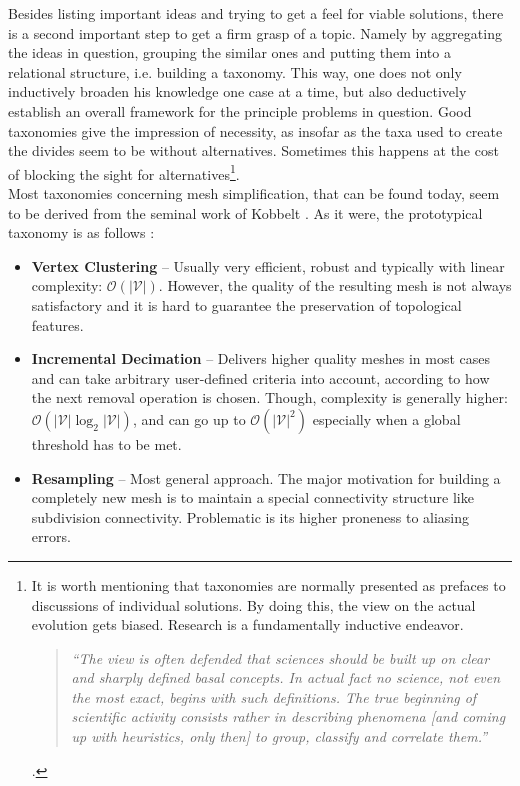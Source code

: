 Besides listing important ideas and trying to get a feel for viable solutions, there is a second important step to get a firm grasp of a topic.
Namely by aggregating the ideas in question, grouping the similar ones and putting them into a relational structure, i.e. building a taxonomy.
This way, one does not only inductively broaden his knowledge one case at a time, but also deductively establish an overall framework for the principle problems in question.
Good taxonomies give the impression of necessity, as insofar as the taxa used to create the divides seem to be without alternatives.
Sometimes this happens at the cost of blocking the sight for alternatives\footnote{ It is worth mentioning that taxonomies are normally presented as prefaces to discussions of individual solutions. By doing this, the view on the actual evolution gets biased. Research is a fundamentally inductive endeavor. \begin{quote} \textit{``The view is often defended that sciences should be built up on clear and sharply defined basal concepts. In actual fact no science, not even the most exact, begins with such definitions. The true beginning of scientific activity consists rather in describing phenomena [and coming up with heuristics, only then] to group, classify and correlate them.''} \citep[cf.][]{Freud1963} \end{quote}.}.\\
Most taxonomies concerning mesh simplification, that can be found today, seem to be derived from the seminal work of Kobbelt \citep[][cf. p.6]{Gotsman2002}.
As it were, the prototypical taxonomy is as follows \citep[][cf. p.11]{Shene2005}:
\begin{itemize}
  \setlength{\itemsep}{0cm}%
  \setlength{\parskip}{0cm}%
    \item \textbf{Vertex Clustering} -- Usually very efficient, robust and typically with linear complexity: $\mathcal{O}(|\mathcal{V}|)$. However, the quality of the resulting mesh is not always satisfactory and it is hard to guarantee the preservation of topological features.\\
    \item \textbf{Incremental Decimation} -- Delivers higher quality meshes in most cases and can take arbitrary user-defined criteria into account, according to how the next removal operation is chosen. Though, complexity is generally higher: $\mathcal{O}(|\mathcal{V}| \log_{2} |\mathcal{V}|)$, and can go up to $\mathcal{O}(|\mathcal{V}|^{2})$ especially when a global threshold has to be met.\\
    \item \textbf{Resampling} -- Most general approach. The major motivation for building a completely new mesh is to maintain a special connectivity structure like subdivision connectivity. Problematic is its higher proneness to aliasing errors.\\
\end{itemize}
